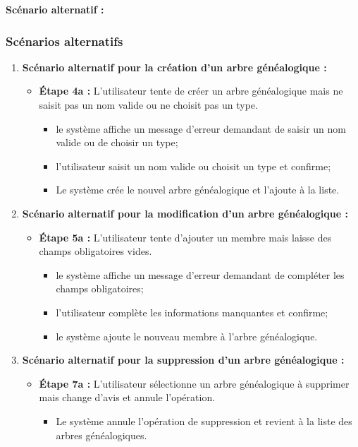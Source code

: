 \begin{enumerate}
\end{enumerate}

\textbf{Scénario alternatif :}

\subsubsection*{Scénarios alternatifs}

\begin{enumerate}
    \item \textbf{Scénario alternatif pour la création d'un arbre généalogique :}
    \begin{itemize}
        \item \textbf{Étape 4a :} L'utilisateur tente de créer un arbre
          généalogique mais ne saisit pas un nom valide ou ne choisit pas un type.
        \begin{itemize}
            \item le système affiche un message d'erreur demandant de saisir
              un nom valide ou de choisir un type;
            \item l'utilisateur saisit un nom valide ou choisit un type et confirme;
            \item Le système crée le nouvel arbre généalogique et l'ajoute à la liste.
        \end{itemize}
    \end{itemize}

    \item \textbf{Scénario alternatif pour la modification d'un arbre généalogique :}
    \begin{itemize}
        \item \textbf{Étape 5a :} L'utilisateur tente d'ajouter un membre mais
          laisse des champs obligatoires vides.
        \begin{itemize}
            \item le système affiche un message d'erreur demandant de compléter les champs obligatoires;
            \item l'utilisateur complète les informations manquantes et confirme;
            \item le système ajoute le nouveau membre à l'arbre généalogique.
        \end{itemize}
    \end{itemize}

    \item \textbf{Scénario alternatif pour la suppression d'un arbre généalogique :}
    \begin{itemize}
        \item \textbf{Étape 7a :} L'utilisateur sélectionne un arbre généalogique à supprimer mais change d'avis et annule l'opération.
        \begin{itemize}
            \item Le système annule l'opération de suppression et revient à la liste des arbres généalogiques.
        \end{itemize}
    \end{itemize}


\end{enumerate}
